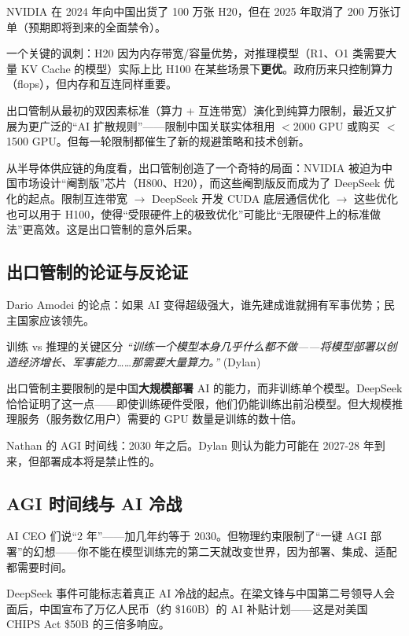 \documentclass[a4paper]{article}
\begin{document}
NVIDIA 在 2024 年向中国出货了 100 万张 H20，但在 2025 年取消了 200 万张订单（预期即将到来的全面禁令）。

一个关键的讽刺：H20 因为内存带宽/容量优势，对推理模型（R1、O1 类需要大量 KV Cache 的模型）实际上比 H100 在某些场景下\textbf{更优}。政府历来只控制算力（flops），但内存和互连同样重要。

出口管制从最初的双因素标准（算力 + 互连带宽）演化到纯算力限制，最近又扩展为更广泛的``AI 扩散规则''——限制中国关联实体租用 $<$2000 GPU 或购买 $<$1500 GPU。但每一轮限制都催生了新的规避策略和技术创新。

从半导体供应链的角度看，出口管制创造了一个奇特的局面：NVIDIA 被迫为中国市场设计``阉割版''芯片（H800、H20），而这些阉割版反而成为了 DeepSeek 优化的起点。限制互连带宽 $\to$ DeepSeek 开发 CUDA 底层通信优化 $\to$ 这些优化也可以用于 H100，使得``受限硬件上的极致优化''可能比``无限硬件上的标准做法''更高效。这是出口管制的意外后果。

\subsection{出口管制的论证与反论证}

Dario Amodei 的论点：如果 AI 变得超级强大，谁先建成谁就拥有军事优势；民主国家应该领先。

\begin{importantbox}{训练 vs 推理的关键区分}
\textit{``训练一个模型本身几乎什么都不做——将模型部署以创造经济增长、军事能力……那需要大量算力。''} (Dylan)

出口管制主要限制的是中国\textbf{大规模部署} AI 的能力，而非训练单个模型。DeepSeek 恰恰证明了这一点——即使训练硬件受限，他们仍能训练出前沿模型。但大规模推理服务（服务数亿用户）需要的 GPU 数量是训练的数十倍。
\end{importantbox}

Nathan 的 AGI 时间线：2030 年之后。Dylan 则认为能力可能在 2027-28 年到来，但部署成本将是禁止性的。

\subsection{AGI 时间线与 AI 冷战}

AI CEO 们说``2 年''——加几年约等于 2030。但物理约束限制了``一键 AGI 部署''的幻想——你不能在模型训练完的第二天就改变世界，因为部署、集成、适配都需要时间。

DeepSeek 事件可能标志着真正 AI 冷战的起点。在梁文锋与中国第二号领导人会面后，中国宣布了万亿人民币（约 \$160B）的 AI 补贴计划——这是对美国 CHIPS Act \$50B 的三倍多响应。
\end{document}
